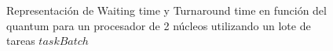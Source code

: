 \begin{figure}[H]
\hfill
{}
\hfill
{}
\hfill
\caption{Representación de Waiting time y Turnaround time en función del quantum para un procesador de 2 núcleos utilizando un lote de tareas $taskBatch$}
\end{figure}

